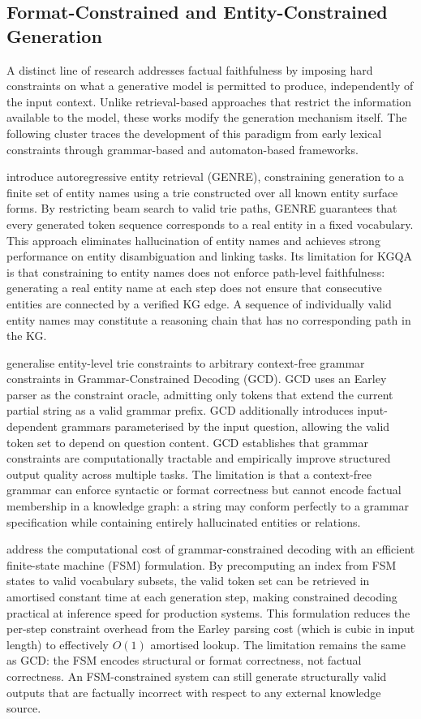 \subsection{Format-Constrained and Entity-Constrained Generation}

A distinct line of research addresses factual faithfulness by imposing hard constraints on what a generative model is permitted to produce, independently of the input context. Unlike retrieval-based approaches that restrict the information available to the model, these works modify the generation mechanism itself. The following cluster traces the development of this paradigm from early lexical constraints through grammar-based and automaton-based frameworks.

\citet{decao2021autoregressive} introduce autoregressive entity retrieval (GENRE), constraining generation to a finite set of entity names using a trie constructed over all known entity surface forms. By restricting beam search to valid trie paths, GENRE guarantees that every generated token sequence corresponds to a real entity in a fixed vocabulary. This approach eliminates hallucination of entity names and achieves strong performance on entity disambiguation and linking tasks. Its limitation for KGQA is that constraining to entity names does not enforce path-level faithfulness: generating a real entity name at each step does not ensure that consecutive entities are connected by a verified KG edge. A sequence of individually valid entity names may constitute a reasoning chain that has no corresponding path in the KG.

\citet{geng2023gcd} generalise entity-level trie constraints to arbitrary context-free grammar constraints in Grammar-Constrained Decoding (GCD). GCD uses an Earley parser as the constraint oracle, admitting only tokens that extend the current partial string as a valid grammar prefix. GCD additionally introduces input-dependent grammars parameterised by the input question, allowing the valid token set to depend on question content. GCD establishes that grammar constraints are computationally tractable and empirically improve structured output quality across multiple tasks. The limitation is that a context-free grammar can enforce syntactic or format correctness but cannot encode factual membership in a knowledge graph: a string may conform perfectly to a grammar specification while containing entirely hallucinated entities or relations.

\citet{willard2023outlines} address the computational cost of grammar-constrained decoding with an efficient finite-state machine (FSM) formulation. By precomputing an index from FSM states to valid vocabulary subsets, the valid token set can be retrieved in amortised constant time at each generation step, making constrained decoding practical at inference speed for production systems. This formulation reduces the per-step constraint overhead from the Earley parsing cost (which is cubic in input length) to effectively $O(1)$ amortised lookup. The limitation remains the same as GCD: the FSM encodes structural or format correctness, not factual correctness. An FSM-constrained system can still generate structurally valid outputs that are factually incorrect with respect to any external knowledge source.

